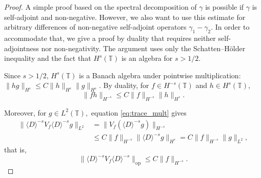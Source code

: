 \documentclass[11pt]{amsart}
\theoremstyle{definition}
\newcommand{\T}{\mathbb{T}}
\begin{document}
\begin{proof}
A simple proof based on the spectral decomposition of $\gamma$ is possible if $\gamma$ is self-adjoint and non-negative. However, we also want to use this estimate for arbitrary differences  of non-negative self-adjoint operators $\gamma_1-\gamma_2.$ In order to accommodate that, we give a proof by duality that requires neither self-adjointness nor non-negativity. The argument uses only the Schatten--H\"older inequality and the fact that $H^s(\T)$ is an algebra for $s>1/2.$

\medskip

Since $s>1/2$, $H^s(\T)$ is a Banach algebra under pointwise multiplication: $\|hg\|_{H^s}\le C\|h\|_{H^s}\|g\|_{H^s}$. By duality, for $f\in H^{-s}(\T)$ and $h\in H^s(\T)$,
\begin{equation}\label{eq:trace_mult}
  \|fh\|_{H^{-s}}
  \le C\|f\|_{H^{-s}}\|h\|_{H^s}.
\end{equation}

\medskip

Moreover, for $g\in L^2(\T),$ equation \eqref{eq:trace_mult} gives
\begin{align*}
  \|\langle D\rangle^{-s}V_f\langle D\rangle^{-s}g\|_{L^2}
  &= \|V_f(\langle D\rangle^{-s}g)\|_{H^{-s}} \\
  &\le C\|f\|_{H^{-s}}\|\langle D\rangle^{-s}g\|_{H^s}
  = C\|f\|_{H^{-s}}\|g\|_{L^2},
\end{align*}
that is,
\begin{equation}\label{eq:trace_op_bound}
  \|\langle D\rangle^{-s}V_f\langle D\rangle^{-s}\|_{\mathrm{op}}
  \le C\|f\|_{H^{-s}}.
\end{equation}

\medskip


\end{proof}
\end{document}
